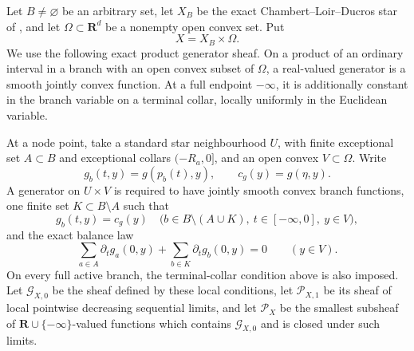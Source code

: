 
\begin{theorem}
\label{thm:p071-infinite-star-euclidean-collapse}
Let $B\ne\varnothing$ be an arbitrary set, let $X_B$ be the exact
Chambert--Loir--Ducros star of
, and let
$\Omega\subset\mathbf R^d$ be a nonempty open convex set.  Put
\[
                             X=X_B\times\Omega .
\]
We use the following exact product generator sheaf.  On a product of an
ordinary interval in a branch with an open convex subset of $\Omega$, a
real-valued generator is a smooth jointly convex function.  At a full
endpoint $-\infty$, it is additionally constant in the branch variable
on a terminal collar, locally uniformly in the Euclidean variable.

At a node point, take a standard star neighbourhood $U$, with finite
exceptional set $A\subset B$ and exceptional collars
$(-R_a,0]$, and an open convex $V\subset\Omega$.  Write
\[
 g_b(t,y)=g(p_b(t),y),\qquad c_g(y)=g(\eta,y).
\]
A generator on $U\times V$ is required to have jointly smooth convex
branch functions, one finite set $K\subset B\setminus A$ such that
\begin{equation}
 g_b(t,y)=c_g(y)
 \quad
 \bigl(b\in B\setminus(A\cup K),\ t\in[-\infty,0],\ y\in V\bigr),
 \label{eq:p071-infinite-euclidean-smooth-finite-activity}
\end{equation}
and the exact balance law
\begin{equation}
 \sum_{a\in A}\partial_tg_a(0,y)
   +\sum_{b\in K}\partial_tg_b(0,y)=0
 \qquad(y\in V).
 \label{eq:p071-infinite-euclidean-smooth-balance}
\end{equation}
On every full active branch, the terminal-collar condition above is also
imposed.  Let $\mathcal G_{X,0}$ be the sheaf defined by these local
conditions, let $\mathcal P_{X,1}$ be its sheaf of local pointwise
decreasing sequential limits, and let $\mathcal P_X$ be the smallest
subsheaf of $\mathbf R\cup\{-\infty\}$-valued functions which contains
$\mathcal G_{X,0}$ and is closed under such limits.


\end{theorem}
